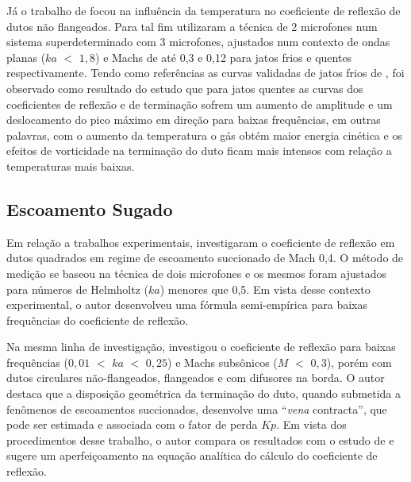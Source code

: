 Já o trabalho de  focou na influência da temperatura no coeficiente de reflexão de dutos não flangeados. Para tal fim utilizaram a técnica de 2 microfones num sistema superdeterminado com 3 microfones, ajustados num contexto de ondas planas ($ka$ $<$ $1,8$) e Machs de até 0,3 e 0,12 para jatos frios e quentes respectivamente. Tendo como referências as curvas validadas de jatos frios de , foi observado como resultado do estudo que para jatos quentes as curvas dos coeficientes de reflexão e de terminação sofrem um aumento de amplitude e um deslocamento do pico máximo em direção para baixas frequências, em outras palavras, com o aumento da temperatura o gás obtém maior energia cinética e os efeitos de vorticidade na terminação do duto ficam mais intensos com relação a temperaturas mais baixas.



\subsection{Escoamento Sugado}

Em relação a trabalhos experimentais,  investigaram o coeficiente de reflexão em dutos quadrados em regime de escoamento succionado de Mach 0,4. O método de medição se baseou na técnica de dois microfones e os mesmos foram ajustados para números de Helmholtz ($ka$) menores que 0,5. Em vista desse contexto experimental, o autor desenvolveu uma fórmula semi-empírica para baixas frequências do coeficiente de reflexão.

Na mesma linha de investigação,  investigou o coeficiente de reflexão para baixas frequências ($0,01$ $<$ $ka$ $<$ $0,25$) e Machs subsônicos ($M$ $<$ $0,3$), porém com dutos circulares não-flangeados, flangeados e com difusores na borda. O autor destaca que a disposição geométrica da terminação do duto, quando submetida a fenômenos de escoamentos succionados, desenvolve uma ``\textit{vena} contracta'', que pode ser estimada e associada com o fator de perda $Kp$. Em vista dos procedimentos desse trabalho, o autor compara os resultados com o estudo de  e sugere um aperfeiçoamento na equação analítica do cálculo do coeficiente de reflexão.

